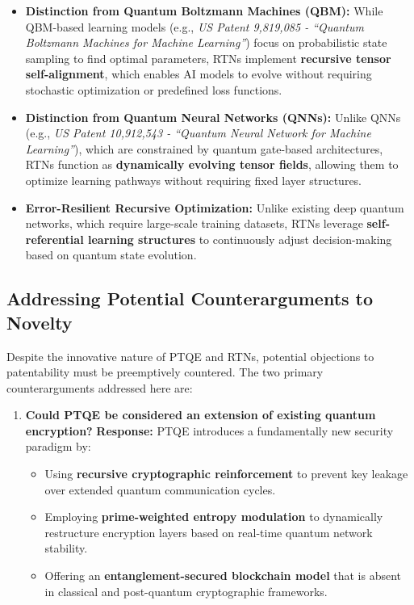 \documentclass{article}
\theoremstyle{plain}
\begin{document}
\begin{itemize}
\begin{itemize}
    \item \textbf{Distinction from Quantum Boltzmann Machines (QBM):} While QBM-based learning models (e.g., \textit{US Patent 9,819,085 - “Quantum Boltzmann Machines for Machine Learning”}) focus on probabilistic state sampling to find optimal parameters, RTNs implement \textbf{recursive tensor self-alignment}, which enables AI models to evolve without requiring stochastic optimization or predefined loss functions.
    \item \textbf{Distinction from Quantum Neural Networks (QNNs):} Unlike QNNs (e.g., \textit{US Patent 10,912,543 - “Quantum Neural Network for Machine Learning”}), which are constrained by quantum gate-based architectures, RTNs function as \textbf{dynamically evolving tensor fields}, allowing them to optimize learning pathways without requiring fixed layer structures.
    \item \textbf{Error-Resilient Recursive Optimization:} Unlike existing deep quantum networks, which require large-scale training datasets, RTNs leverage \textbf{self-referential learning structures} to continuously adjust decision-making based on quantum state evolution.
\end{itemize}

\subsection{Addressing Potential Counterarguments to Novelty}

Despite the innovative nature of PTQE and RTNs, potential objections to patentability must be preemptively countered. The two primary counterarguments addressed here are:

\begin{enumerate}
    \item \textbf{Could PTQE be considered an extension of existing quantum encryption?}  
    \textbf{Response:} PTQE introduces a fundamentally new security paradigm by:
    \begin{itemize}
        \item Using \textbf{recursive cryptographic reinforcement} to prevent key leakage over extended quantum communication cycles.
        \item Employing \textbf{prime-weighted entropy modulation} to dynamically restructure encryption layers based on real-time quantum network stability.
        \item Offering an \textbf{entanglement-secured blockchain model} that is absent in classical and post-quantum cryptographic frameworks.
    \end{itemize}


\end{enumerate}
\end{itemize}
\end{document}
